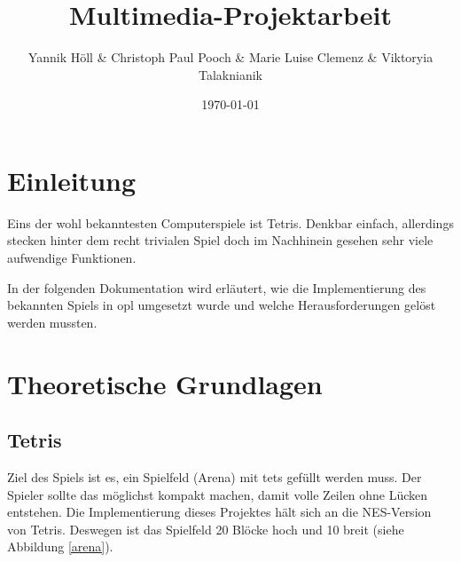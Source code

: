 \documentclass[11pt]{article}
\title{\textbf{Multimedia-Projektarbeit}}
\author{Yannik Höll \& Christoph Paul Pooch \& Marie Luise Clemenz \& Viktoryia Talaknianik}
\date{\today}
\newcommand{\refabb}[1]{Abbildung \ref{#1}}
\begin{document}
\begin{titlingpage}
    \maketitle
\end{titlingpage}
\pagebreak

\tableofcontents
\pagebreak

\listoffigures
\pagebreak

\glsaddall
\printglossary 
\pagebreak

\section{Einleitung} 
Eins der wohl bekanntesten Computerspiele ist Tetris. Denkbar einfach, allerdings stecken hinter
dem recht trivialen Spiel doch im Nachhinein gesehen sehr viele aufwendige Funktionen.

In der folgenden Dokumentation wird erläutert, wie die Implementierung des bekannten Spiels in \gls{opl} 
umgesetzt wurde und welche Herausforderungen gelöst werden mussten.


\section{Theoretische Grundlagen} \label{tgl}

\subsection{Tetris} \label{def-tet}
Ziel des Spiels ist es, ein Spielfeld (Arena) mit \glspl{tet} gefüllt werden muss. Der Spieler sollte das möglichst kompakt machen, 
damit volle Zeilen ohne Lücken entstehen. Die Implementierung dieses Projektes hält sich an die NES-Version von Tetris. 
Deswegen ist das Spielfeld 20 Blöcke hoch und 10 breit (siehe \refabb{arena}). 
\end{document}
